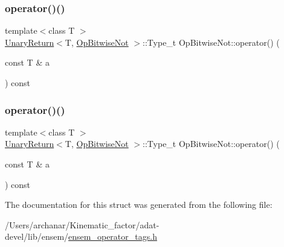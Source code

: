 \mbox{\label{structOpBitwiseNot_a32565bc96d1f735f04d98179d595ae07}} 
\subsubsection{\texorpdfstring{operator()()}{operator()()}\hspace{0.1cm}{\footnotesize\ttfamily [2/3]}}
{\footnotesize\ttfamily template$<$class T $>$ \\
\mbox{\hyperlink{structUnaryReturn}{Unary\+Return}}$<$T, \mbox{\hyperlink{structOpBitwiseNot}{Op\+Bitwise\+Not}} $>$\+::Type\+\_\+t Op\+Bitwise\+Not\+::operator() (\begin{DoxyParamCaption}\item[{const T \&}]{a }\end{DoxyParamCaption}) const\hspace{0.3cm}{\ttfamily [inline]}}

\mbox{\label{structOpBitwiseNot_a32565bc96d1f735f04d98179d595ae07}} 
\subsubsection{\texorpdfstring{operator()()}{operator()()}\hspace{0.1cm}{\footnotesize\ttfamily [3/3]}}
{\footnotesize\ttfamily template$<$class T $>$ \\
\mbox{\hyperlink{structUnaryReturn}{Unary\+Return}}$<$T, \mbox{\hyperlink{structOpBitwiseNot}{Op\+Bitwise\+Not}} $>$\+::Type\+\_\+t Op\+Bitwise\+Not\+::operator() (\begin{DoxyParamCaption}\item[{const T \&}]{a }\end{DoxyParamCaption}) const\hspace{0.3cm}{\ttfamily [inline]}}



The documentation for this struct was generated from the following file\+:\begin{DoxyCompactItemize}
\item 
/\+Users/archanar/\+Kinematic\+\_\+factor/adat-\/devel/lib/ensem/\mbox{\hyperlink{adat-devel_2lib_2ensem_2ensem__operator__tags_8h}{ensem\+\_\+operator\+\_\+tags.\+h}}\end{DoxyCompactItemize}
